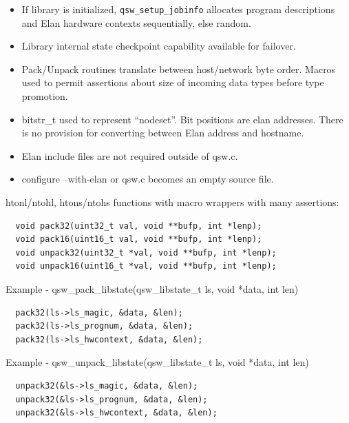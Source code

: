 \documentclass[letter,landscape]{seminar}
\begin{document}
\begin{slide}
  \small
  \begin{itemize}
  \item If library is initialized, {\tt qsw\_setup\_jobinfo} allocates
  program descriptions and Elan hardware contexts sequentially, else random.
  \item Library internal state checkpoint capability available for failover.
  \item Pack/Unpack routines translate between host/network byte order.
  Macros used to permit assertions about size of incoming data types before
  type promotion.
  \item bitstr\_t used to represent ``nodeset''.  Bit positions are elan
  addresses.  There is no provision for converting between Elan address and
  hostname.
  \item Elan include files are not required outside of qsw.c.
  \item configure --with-elan or qsw.c becomes an empty source file.
  \end{itemize}
\end{slide}

\begin{slide}
  \tiny
  htonl/ntohl, htons/ntohs functions with macro wrappers with many assertions:
  \begin{verbatim}
  void pack32(uint32_t val, void **bufp, int *lenp);
  void pack16(uint16_t val, void **bufp, int *lenp);
  void unpack32(uint32_t *val, void **bufp, int *lenp);
  void unpack16(uint16_t *val, void **bufp, int *lenp);
  \end{verbatim}
  Example - qsw\_pack\_libstate(qsw\_libstate\_t ls, void *data, int len)
  \begin{verbatim}
  pack32(ls->ls_magic, &data, &len);
  pack32(ls->ls_prognum, &data, &len);
  pack32(ls->ls_hwcontext, &data, &len);
  \end{verbatim}
  Example - qsw\_unpack\_libstate(qsw\_libstate\_t ls, void *data, int len)
  \begin{verbatim}
  unpack32(&ls->ls_magic, &data, &len);
  unpack32(&ls->ls_prognum, &data, &len);
  unpack32(&ls->ls_hwcontext, &data, &len);
  \end{verbatim}
\end{slide}
\end{document}
